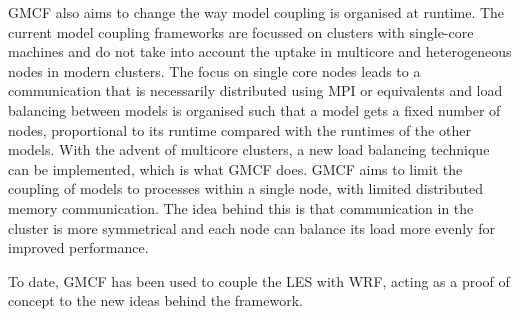 GMCF also aims to change the way model coupling is organised at runtime. The
current model coupling frameworks are focussed on clusters with single-core
machines and do not take into account the uptake in multicore and heterogeneous
nodes in modern clusters. The focus on single core nodes leads to a
communication that is necessarily distributed using MPI or equivalents and load
balancing between models is organised such that a model gets a fixed number of
nodes, proportional to its runtime compared with the runtimes of the other
models. With the advent of multicore clusters, a new load balancing technique
can be implemented, which is what GMCF does. GMCF aims to limit the coupling of
models to processes within a single node, with limited distributed memory
communication. The idea behind this is that communication in the cluster is more
symmetrical and each node can balance its load more evenly for improved
performance.

To date, GMCF has been used to couple the LES with WRF, acting as a proof of
concept to the new ideas behind the framework.

